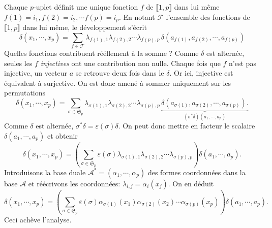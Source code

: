 \begin{demo}
\begin{displaymath}
\end{displaymath}
Chaque $p$-uplet définit une unique fonction $f$ de $\llbracket 1,p \rrbracket$ dans lui même $f(1)=i_1,f(2)=i_2,\cdots f(p)=i_p$. En notant $\mathcal{F}$ l'ensemble des fonctions de $\llbracket 1,p \rrbracket$ dans lui même, le développement s'écrit
\begin{displaymath}
\delta(x_1,\cdots,x_p)=
\sum_{f\in \mathcal{F}}\lambda_{f(1),1}\lambda_{f(2),2}\cdots \lambda_{f(p),p} 
\,\delta\left(a_{f(1)},a_{f(2)},\cdots,a_{f(p)} \right)  
\end{displaymath}
Quelles fonctions contribuent rééllement à la somme ?\newline
Comme $\delta$ est alternée, seules les $f$ \emph{injectives} ont une contribution non nulle. Chaque fois que $f$ n'est pas injective, un vecteur $a$ se retrouve deux fois dans le $\delta$. Or ici, injective est équivalent à surjective. On est donc amené à sommer uniquement sur les permutations
\begin{displaymath}
\delta(x_1,\cdots,x_p)=
\sum_{\sigma\in \mathfrak{S}_p}\lambda_{\sigma(1),1}\lambda_{\sigma(2),2}\cdots \lambda_{\sigma(p),p} 
\,
\underset{(\sigma^* \delta)(a_1,\cdots,a_p)}{
  \underbrace{
    \delta\left(a_{\sigma(1)},a_{\sigma(2)},\cdots,a_{\sigma(p)} \right).
  }
}  
\end{displaymath}
Comme $\delta$ est alternée, $\sigma^* \delta=\varepsilon(\sigma)\delta$. On peut donc mettre en facteur le scalaire $\delta(a_1,\cdots,a_p)$ et obtenir
\begin{displaymath}
\delta(x_1,\cdots,x_p)= \left( 
\sum_{\sigma\in \mathfrak{S}_p}\varepsilon(\sigma)\lambda_{\sigma(1),1}\lambda_{\sigma(2),2}\cdots \lambda_{\sigma(p),p}
\right) \delta(a_1,\cdots,a_p).
\end{displaymath}
Introduisons la base duale $\mathcal{A}^*=(\alpha_1,\cdots,\alpha_p)$ des formes coordonnées dans la base $\mathcal{A}$ et réécrivons les coordonnées: $\lambda_{i,j}=\alpha_i(x_j)$. On en déduit
\begin{displaymath}
\delta(x_1,\cdots,x_p)= \left( 
\sum_{\sigma\in \mathfrak{S}_p}\varepsilon(\sigma)\alpha_{\sigma(1)}(x_1)\alpha_{\sigma(2)}(x_2)\cdots \alpha_{\sigma(p)}(x_p)
\right) \delta(a_1,\cdots,a_p).
\end{displaymath}
Ceci achève l'analyse.


\end{demo}

